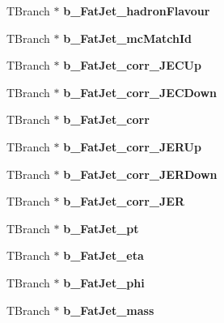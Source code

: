 \begin{DoxyCompactItemize}
T\+Branch $\ast$ {\bfseries b\+\_\+\+Fat\+Jet\+\_\+hadron\+Flavour}
\item 
\hypertarget{classMiniTree_a00dff791e808d0ba297b82143bc2bf8a}{}\label{classMiniTree_a00dff791e808d0ba297b82143bc2bf8a} 
T\+Branch $\ast$ {\bfseries b\+\_\+\+Fat\+Jet\+\_\+mc\+Match\+Id}
\item 
\hypertarget{classMiniTree_a7d990f3c76ebad2f83e0bf3283a6feaa}{}\label{classMiniTree_a7d990f3c76ebad2f83e0bf3283a6feaa} 
T\+Branch $\ast$ {\bfseries b\+\_\+\+Fat\+Jet\+\_\+corr\+\_\+\+J\+E\+C\+Up}
\item 
\hypertarget{classMiniTree_a495418f446e7a8df0b71d15b316541bd}{}\label{classMiniTree_a495418f446e7a8df0b71d15b316541bd} 
T\+Branch $\ast$ {\bfseries b\+\_\+\+Fat\+Jet\+\_\+corr\+\_\+\+J\+E\+C\+Down}
\item 
\hypertarget{classMiniTree_aa504b0cc469f6609149e486f86f413ce}{}\label{classMiniTree_aa504b0cc469f6609149e486f86f413ce} 
T\+Branch $\ast$ {\bfseries b\+\_\+\+Fat\+Jet\+\_\+corr}
\item 
\hypertarget{classMiniTree_ae451d5801ecfc8f328b4d527bd18b569}{}\label{classMiniTree_ae451d5801ecfc8f328b4d527bd18b569} 
T\+Branch $\ast$ {\bfseries b\+\_\+\+Fat\+Jet\+\_\+corr\+\_\+\+J\+E\+R\+Up}
\item 
\hypertarget{classMiniTree_a13a77da978742e0f660c987c9f103233}{}\label{classMiniTree_a13a77da978742e0f660c987c9f103233} 
T\+Branch $\ast$ {\bfseries b\+\_\+\+Fat\+Jet\+\_\+corr\+\_\+\+J\+E\+R\+Down}
\item 
\hypertarget{classMiniTree_aa6a3d6f1e4011b4d1eba51cda88f9f1b}{}\label{classMiniTree_aa6a3d6f1e4011b4d1eba51cda88f9f1b} 
T\+Branch $\ast$ {\bfseries b\+\_\+\+Fat\+Jet\+\_\+corr\+\_\+\+J\+ER}
\item 
\hypertarget{classMiniTree_a8b91fc38988c37ee6df22f12a1d217e4}{}\label{classMiniTree_a8b91fc38988c37ee6df22f12a1d217e4} 
T\+Branch $\ast$ {\bfseries b\+\_\+\+Fat\+Jet\+\_\+pt}
\item 
\hypertarget{classMiniTree_a66a8458e0de316591035f8da0bd7d26c}{}\label{classMiniTree_a66a8458e0de316591035f8da0bd7d26c} 
T\+Branch $\ast$ {\bfseries b\+\_\+\+Fat\+Jet\+\_\+eta}
\item 
\hypertarget{classMiniTree_a802eca40e9416e1e5699ce6567959b81}{}\label{classMiniTree_a802eca40e9416e1e5699ce6567959b81} 
T\+Branch $\ast$ {\bfseries b\+\_\+\+Fat\+Jet\+\_\+phi}
\item 
\hypertarget{classMiniTree_abe7e31b9b62319376f9023d4f3fb17fb}{}\label{classMiniTree_abe7e31b9b62319376f9023d4f3fb17fb} 
T\+Branch $\ast$ {\bfseries b\+\_\+\+Fat\+Jet\+\_\+mass}

\end{DoxyCompactItemize}
